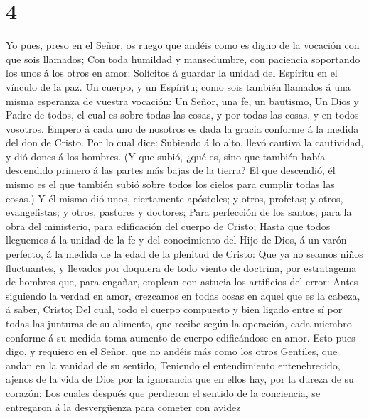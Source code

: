 \hypertarget{section-3}{%
\section{4}\label{section-3}}

 Yo pues, preso en el Señor, os ruego que andéis como es
digno de la vocación con que sois llamados;  Con toda
humildad y mansedumbre, con paciencia soportando los unos á los otros en
amor;  Solícitos á guardar la unidad del Espíritu en el
vínculo de la paz.  Un cuerpo, y un Espíritu; como sois
también llamados á una misma esperanza de vuestra vocación:
 Un Señor, una fe, un bautismo,  Un Dios y
Padre de todos, el cual es sobre todas las cosas, y por todas las cosas,
y en todos vosotros.  Empero á cada uno de nosotros es
dada la gracia conforme á la medida del don de Cristo. 
Por lo cual dice: Subiendo á lo alto, llevó cautiva la cautividad, y dió
dones á los hombres.  (Y que subió, ¿qué es, sino que
también había descendido primero á las partes más bajas de la tierra?
 El que descendió, él mismo es el que también subió sobre
todos los cielos para cumplir todas las cosas.)  Y él
mismo dió unos, ciertamente apóstoles; y otros, profetas; y otros,
evangelistas; y otros, pastores y doctores;  Para
perfección de los santos, para la obra del ministerio, para edificación
del cuerpo de Cristo;  Hasta que todos lleguemos á la
unidad de la fe y del conocimiento del Hijo de Dios, á un varón
perfecto, á la medida de la edad de la plenitud de Cristo:
 Que ya no seamos niños fluctuantes, y llevados por
doquiera de todo viento de doctrina, por estratagema de hombres que,
para engañar, emplean con astucia los artificios del error:
 Antes siguiendo la verdad en amor, crezcamos en todas
cosas en aquel que es la cabeza, á saber, Cristo;  Del
cual, todo el cuerpo compuesto y bien ligado entre sí por todas las
junturas de su alimento, que recibe según la operación, cada miembro
conforme á su medida toma aumento de cuerpo edificándose en amor.
 Esto pues digo, y requiero en el Señor, que no andéis
más como los otros Gentiles, que andan en la vanidad de su sentido,
 Teniendo el entendimiento entenebrecido, ajenos de la
vida de Dios por la ignorancia que en ellos hay, por la dureza de su
corazón:  Los cuales después que perdieron el sentido de
la conciencia, se entregaron á la desvergüenza para cometer con avidez
